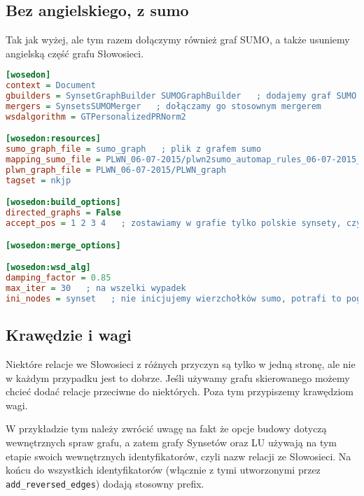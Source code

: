 \documentclass[10pt,a4paper]{article}
\begin{document}
\subsection{Bez angielskiego, z sumo}
Tak jak wyżej, ale tym razem dołączymy również graf SUMO, a także usuniemy angielską część grafu Słowosieci.

\begin{lstlisting}[language=Ini]
[wosedon]
context = Document
gbuilders = SynsetGraphBuilder SUMOGraphBuilder   ; dodajemy graf SUMO
mergers = SynsetsSUMOMerger   ; dołączamy go stosownym mergerem
wsdalgorithm = GTPersonalizedPRNorm2

[wosedon:resources]
sumo_graph_file = sumo_graph   ; plik z grafem sumo
mapping_sumo_file = PLWN_06-07-2015/plwn2sumo_automap_rules_06-07-2015_resolved-rreduced-bulbuled-oknaked-corec-serdel-rubin.csv   ; mapowanie grafu sumo na Słowosieć
plwn_graph_file = PLWN_06-07-2015/PLWN_graph
tagset = nkjp

[wosedon:build_options]
directed_graphs = False
accept_pos = 1 2 3 4   ; zostawiamy w grafie tylko polskie synsety, czyli te o polskich częściach mowy

[wosedon:merge_options]

[wosedon:wsd_alg]
damping_factor = 0.85
max_iter = 30   ; na wszelki wypadek
ini_nodes = synset   ; nie inicjujemy wierzchołków sumo, potrafi to pogorszyć wyniki

\end{lstlisting}

\subsection{Krawędzie i wagi}
Niektóre relacje we Słowosieci z różnych przyczyn są tylko w jedną stronę, ale nie w każdym przypadku jest to dobrze. Jeśli używamy grafu skierowanego możemy chcieć dodać relacje przeciwne do niektórych. Poza tym przypiszemy krawędziom wagi.

W przykładzie tym należy zwrócić uwagę na fakt że opcje budowy dotyczą wewnętrznych spraw grafu, a zatem grafy Synsetów oraz LU używają na tym etapie swoich wewnętrznych identyfikatorów, czyli nazw relacji ze Słowosieci. Na końcu do wszystkich identyfikatorów (włącznie z tymi utworzonymi przez \texttt{add\_reversed\_edges}) dodają stosowny prefix.
\end{document}
